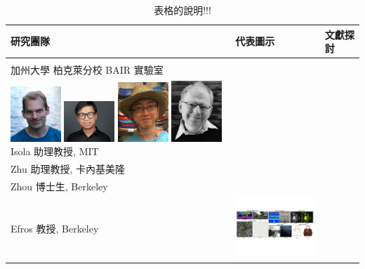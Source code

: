 \begin{table}[h!]
  \centering
  \caption{表格的說明!!!}
  \label{tbl:myLboro}
  \begin{tabular}{ | m{4.5cm} | m{4.5cm} | m{5.5cm} | }
    \hline
    研究團隊 & \centering 代表圖示  & 文獻探討 \\
    \hline
    \begin{minipage}{.25\textwidth}
      ~ \\ 加州大學 柏克萊分校 BAIR 實驗室 \\ 
      \includegraphics[width=1.9cm]{fig/Isola2017/Isola.jpg} 
      \includegraphics[width=1.9cm]{fig/Isola2017/Zhu.jpg}
      \includegraphics[width=1.9cm]{fig/Isola2017/Zhou.png} 
      \includegraphics[width=1.9cm]{fig/Isola2017/Efros.jpg}
      Isola 助理教授, MIT \\
      Zhu 助理教授, 卡內基美隆 \\      
      Zhou 博士生, Berkeley \\
      Efros 教授, Berkeley
    \end{minipage}
    &
      \includegraphics[width=4.3cm]{fig/Isola2017/teaser_v3.pdf}

\end{tabular}
\end{table}

